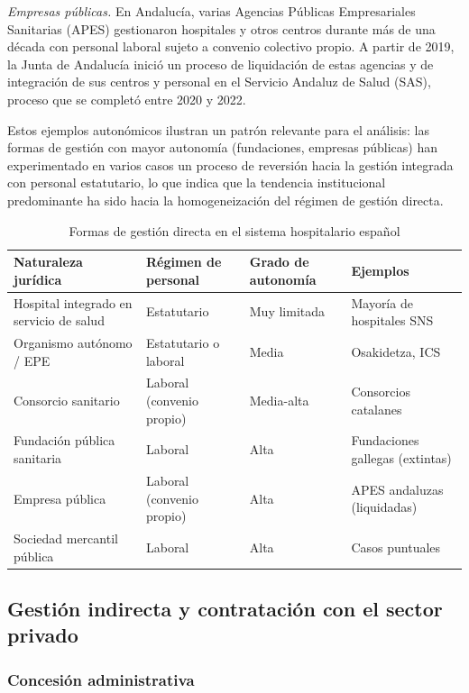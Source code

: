 \textit{Empresas públicas.} En Andalucía, varias Agencias Públicas Empresariales Sanitarias (APES) gestionaron hospitales y otros centros durante más de una década con personal laboral sujeto a convenio colectivo propio. A partir de 2019, la Junta de Andalucía inició un proceso de liquidación de estas agencias y de integración de sus centros y personal en el Servicio Andaluz de Salud (SAS), proceso que se completó entre 2020 y 2022.

Estos ejemplos autonómicos ilustran un patrón relevante para el análisis: las formas de gestión con mayor autonomía (fundaciones, empresas públicas) han experimentado en varios casos un proceso de reversión hacia la gestión integrada con personal estatutario, lo que indica que la tendencia institucional predominante ha sido hacia la homogeneización del régimen de gestión directa.

\begin{table}[htbp]
\centering
\caption{Formas de gestión directa en el sistema hospitalario español}
\label{tab:gestion_directa}
\small
\begin{tabular}{p{3.2cm}p{3cm}p{2.8cm}p{3.5cm}}
\toprule
\textbf{Naturaleza jurídica} & \textbf{Régimen de personal} & \textbf{Grado de autonomía} & \textbf{Ejemplos} \\
\midrule
Hospital integrado en servicio de salud & Estatutario & Muy limitada & Mayoría de hospitales SNS \\[4pt]
Organismo autónomo / EPE & Estatutario o laboral & Media & Osakidetza, ICS \\[4pt]
Consorcio sanitario & Laboral (convenio propio) & Media-alta & Consorcios catalanes \\[4pt]
Fundación pública sanitaria & Laboral & Alta & Fundaciones gallegas (extintas) \\[4pt]
Empresa pública & Laboral (convenio propio) & Alta & APES andaluzas (liquidadas) \\[4pt]
Sociedad mercantil pública & Laboral & Alta & Casos puntuales \\
\bottomrule
\end{tabular}
\end{table}

\subsection{Gestión indirecta y contratación con el sector privado}
\label{sec:gestion_indirecta}

\subsubsection{Concesión administrativa}

